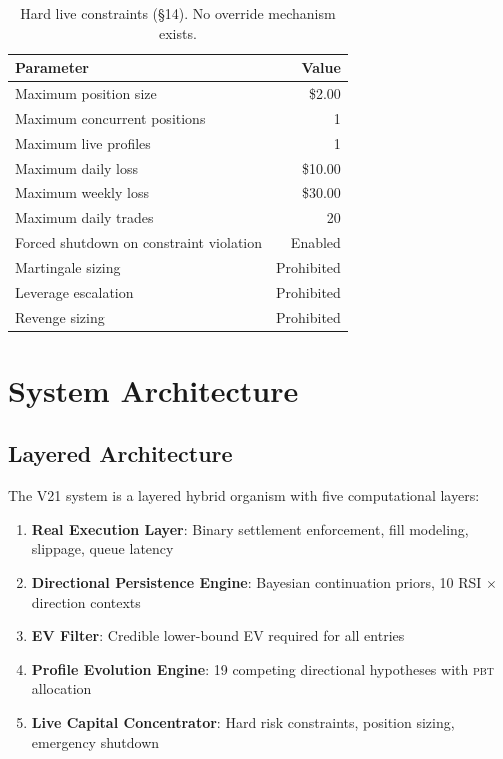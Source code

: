\documentclass[11pt,a4paper]{article}
\newcommand{\pbt}{\textsc{pbt}}
\begin{document}
\begin{table}[h]
\centering
\begin{tabular}{@{}lr@{}}
\toprule
\textbf{Parameter} & \textbf{Value} \\
\midrule
Maximum position size & \$2.00 \\
Maximum concurrent positions & 1 \\
Maximum live profiles & 1 \\
Maximum daily loss & \$10.00 \\
Maximum weekly loss & \$30.00 \\
Maximum daily trades & 20 \\
Forced shutdown on constraint violation & Enabled \\
Martingale sizing & Prohibited \\
Leverage escalation & Prohibited \\
Revenge sizing & Prohibited \\
\bottomrule
\end{tabular}
\caption{Hard live constraints (\S14). No override mechanism exists.}
\label{tab:live_constraints}
\end{table}

\section{System Architecture}\label{sec:architecture}

\subsection{Layered Architecture}

The V21 system is a layered hybrid organism with five computational layers:

\begin{enumerate}
    \item \textbf{Real Execution Layer}: Binary settlement enforcement, fill modeling, slippage, queue latency
    \item \textbf{Directional Persistence Engine}: Bayesian continuation priors, 10 RSI $\times$ direction contexts
    \item \textbf{EV Filter}: Credible lower-bound EV required for all entries
    \item \textbf{Profile Evolution Engine}: 19 competing directional hypotheses with \pbt{} allocation
    \item \textbf{Live Capital Concentrator}: Hard risk constraints, position sizing, emergency shutdown
\end{enumerate}
\end{document}
